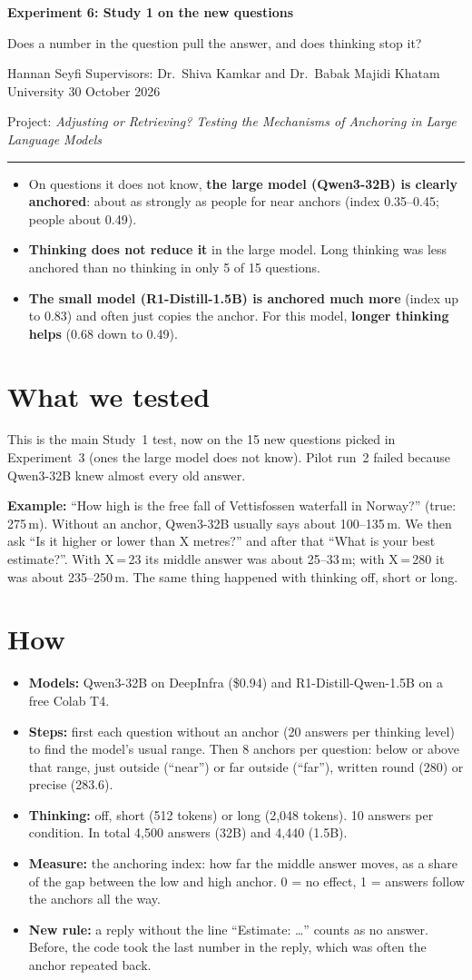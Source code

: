 \documentclass[11pt,a4paper]{article}
\newcommand{\inshort}[1]{\begin{tcolorbox}[colback=gray!6,colframe=gray!50,title=\textbf{In short},fonttitle=\normalsize]#1\end{tcolorbox}}
\newcommand{\header}[3]{%
  {\Large\textbf{#1}}\par\smallskip
  {\large #2}\par\smallskip
  {\small Hannan Seyfi \textperiodcentered{} Supervisors: Dr.\ Shiva Kamkar and Dr.\ Babak Majidi \textperiodcentered{} Khatam University \textperiodcentered{} #3}\par
  {\small Project: \emph{Adjusting or Retrieving? Testing the Mechanisms of Anchoring in Large Language Models}}\par\medskip\hrule\medskip}
\begin{document}
\header{Experiment 6: Study 1 on the new questions}{Does a number in the question pull the answer, and does thinking stop it?}{30 October 2026}

\inshort{\begin{itemize}[leftmargin=*]
  \item On questions it does not know, \textbf{the large model (Qwen3-32B) is clearly anchored}: about as strongly as people for near anchors (index 0.35--0.45; people about 0.49).
  \item \textbf{Thinking does not reduce it} in the large model. Long thinking was less anchored than no thinking in only 5 of 15 questions.
  \item \textbf{The small model (R1-Distill-1.5B) is anchored much more} (index up to 0.83) and often just copies the anchor. For this model, \textbf{longer thinking helps} (0.68 down to 0.49).
\end{itemize}}

\section*{What we tested}
This is the main Study~1 test, now on the 15 new questions picked in Experiment~3 (ones the large model does not know). Pilot run~2 failed because Qwen3-32B knew almost every old answer.

\textbf{Example:} \enquote{How high is the free fall of Vettisfossen waterfall in Norway?} (true: 275\,m). Without an anchor, Qwen3-32B usually says about 100--135\,m. We then ask \enquote{Is it higher or lower than X metres?} and after that \enquote{What is your best estimate?}. With X\,=\,23 its middle answer was about 25--33\,m; with X\,=\,280 it was about 235--250\,m. The same thing happened with thinking off, short or long.

\section*{How}
\begin{itemize}[leftmargin=*]
  \item \textbf{Models:} Qwen3-32B on DeepInfra (\$0.94) and R1-Distill-Qwen-1.5B on a free Colab T4.
  \item \textbf{Steps:} first each question without an anchor (20 answers per thinking level) to find the model's usual range. Then 8 anchors per question: below or above that range, just outside (\enquote{near}) or far outside (\enquote{far}), written round (280) or precise (283.6).
  \item \textbf{Thinking:} off, short (512 tokens) or long (2,048 tokens). 10 answers per condition. In total 4,500 answers (32B) and 4,440 (1.5B).
  \item \textbf{Measure:} the anchoring index: how far the middle answer moves, as a share of the gap between the low and high anchor. 0 = no effect, 1 = answers follow the anchors all the way.
  \item \textbf{New rule:} a reply without the line \enquote{Estimate: \ldots} counts as no answer. Before, the code took the last number in the reply, which was often the anchor repeated back.
\end{itemize}
\end{document}
